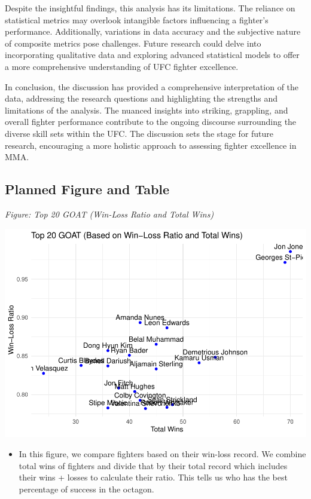\documentclass[
  man,floatsintext]{apa6}
\providecommand{\tightlist}{%
  \setlength{\itemsep}{0pt}\setlength{\parskip}{0pt}}
\begin{document}
Despite the insightful findings, this analysis has its limitations. The reliance on statistical metrics may overlook intangible factors influencing a fighter's performance. Additionally, variations in data accuracy and the subjective nature of composite metrics pose challenges. Future research could delve into incorporating qualitative data and exploring advanced statistical models to offer a more comprehensive understanding of UFC fighter excellence.

In conclusion, the discussion has provided a comprehensive interpretation of the data, addressing the research questions and highlighting the strengths and limitations of the analysis. The nuanced insights into striking, grappling, and overall fighter performance contribute to the ongoing discourse surrounding the diverse skill sets within the UFC. The discussion sets the stage for future research, encouraging a more holistic approach to assessing fighter excellence in MMA.

\hypertarget{planned-figure-and-table}{%
\subsection{Planned Figure and Table}\label{planned-figure-and-table}}

\emph{Figure: Top 20 GOAT (Win-Loss Ratio and Total Wins)}

\includegraphics{Into-the-UFC_files/figure-latex/unnamed-chunk-1-1.pdf}

\begin{itemize}
\tightlist
\item
  In this figure, we compare fighters based on their win-loss record. We combine total wins of fighters and divide that by their total record which includes their wins + losses to calculate their ratio. This tells us who has the best percentage of success
  in the octagon.
\end{itemize}
\end{document}
